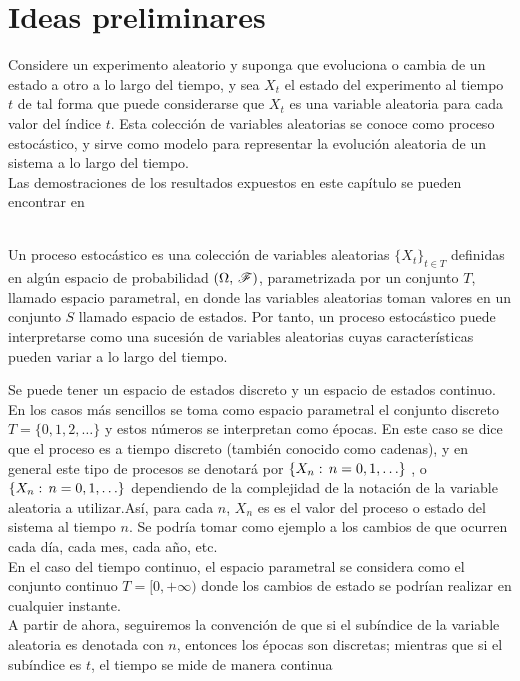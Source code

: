 \section{Ideas preliminares}
Considere un experimento aleatorio y suponga que evoluciona o cambia de un estado a otro a lo largo del tiempo, y sea $X_t$ el estado del experimento al tiempo $t$ de tal forma que puede considerarse
que $X_t$ es una variable aleatoria para cada valor del índice $t$. Esta colección de variables aleatorias se conoce como proceso estocástico, y sirve como modelo para representar la evolución aleatoria de un sistema a lo largo del tiempo.\\
Las demostraciones de los resultados expuestos en este capítulo se pueden encontrar en\\\\
\begin{Def}
    Un proceso estocástico es una colección de variables aleatorias $\{X_t\}_{t\in T}$ definidas en algún espacio de probabilidad $(\Omega,\thinspace\mathscr{F})$, parametrizada por un conjunto $T$, llamado espacio parametral, en donde las variables aleatorias toman valores en un conjunto $S$ llamado espacio de estados.
    Por tanto, un proceso estocástico puede interpretarse como una sucesión de variables aleatorias cuyas características pueden variar a lo largo del tiempo.
\end{Def}
Se puede tener un espacio de estados discreto y un espacio de estados continuo.
En los casos más sencillos se toma como espacio parametral el conjunto
discreto $T= \{0, 1, 2,\ldots\}$ y estos números se interpretan como épocas. En este caso se dice que el proceso es a tiempo discreto (también conocido como cadenas), y en general este tipo
de procesos se denotará por $\{X_n:\thinspace n= 0, 1, \ldots\}$ , o $\{X_n:\thinspace n= 0, 1, \ldots\}$ dependiendo de la complejidad de la notación de la variable aleatoria a utilizar.Así, para cada $n$, $X_n$ es es el valor del proceso o estado del sistema al tiempo $n$.
Se podría tomar como ejemplo a los cambios de que ocurren cada día, cada mes, cada año, etc.\\ En el caso del tiempo continuo, el espacio parametral se considera como el conjunto continuo $T=[0,+\infty)$ donde los cambios de estado se podrían realizar en cualquier instante.\\
A partir de ahora, seguiremos la convención de que si el subíndice de la variable aleatoria es denotada con $n$, entonces los épocas son discretas; mientras que si el subíndice es $t$, el tiempo se mide de manera continua\\
